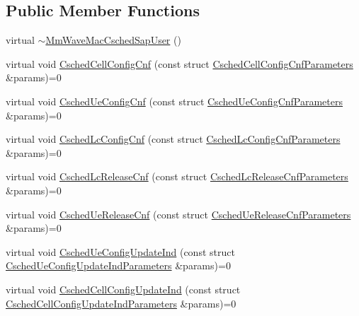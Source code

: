 \subsection*{Public Member Functions}
\begin{DoxyCompactItemize}
\item 
virtual \hyperlink{classns3_1_1MmWaveMacCschedSapUser_a8f051665b658dd765fa5a56bac25d868}{$\sim$\+Mm\+Wave\+Mac\+Csched\+Sap\+User} ()
\item 
virtual void \hyperlink{classns3_1_1MmWaveMacCschedSapUser_ac321b5a86d1d08a4618d9c0c6898f1df}{Csched\+Cell\+Config\+Cnf} (const struct \hyperlink{structns3_1_1MmWaveMacCschedSapUser_1_1CschedCellConfigCnfParameters}{Csched\+Cell\+Config\+Cnf\+Parameters} \&params)=0
\item 
virtual void \hyperlink{classns3_1_1MmWaveMacCschedSapUser_a7c6574b01ef6cfd72a3c027142dff19c}{Csched\+Ue\+Config\+Cnf} (const struct \hyperlink{structns3_1_1MmWaveMacCschedSapUser_1_1CschedUeConfigCnfParameters}{Csched\+Ue\+Config\+Cnf\+Parameters} \&params)=0
\item 
virtual void \hyperlink{classns3_1_1MmWaveMacCschedSapUser_aade532cb1d8a39c0f33c59d0530de20b}{Csched\+Lc\+Config\+Cnf} (const struct \hyperlink{structns3_1_1MmWaveMacCschedSapUser_1_1CschedLcConfigCnfParameters}{Csched\+Lc\+Config\+Cnf\+Parameters} \&params)=0
\item 
virtual void \hyperlink{classns3_1_1MmWaveMacCschedSapUser_a39c995da0285c00af8e3553373fe47b8}{Csched\+Lc\+Release\+Cnf} (const struct \hyperlink{structns3_1_1MmWaveMacCschedSapUser_1_1CschedLcReleaseCnfParameters}{Csched\+Lc\+Release\+Cnf\+Parameters} \&params)=0
\item 
virtual void \hyperlink{classns3_1_1MmWaveMacCschedSapUser_a661fe2e7ba32c3720860977aeb599a2c}{Csched\+Ue\+Release\+Cnf} (const struct \hyperlink{structns3_1_1MmWaveMacCschedSapUser_1_1CschedUeReleaseCnfParameters}{Csched\+Ue\+Release\+Cnf\+Parameters} \&params)=0
\item 
virtual void \hyperlink{classns3_1_1MmWaveMacCschedSapUser_a10f72301f3a7ae3ebe39291ba5360dea}{Csched\+Ue\+Config\+Update\+Ind} (const struct \hyperlink{structns3_1_1MmWaveMacCschedSapUser_1_1CschedUeConfigUpdateIndParameters}{Csched\+Ue\+Config\+Update\+Ind\+Parameters} \&params)=0
\item 
virtual void \hyperlink{classns3_1_1MmWaveMacCschedSapUser_a1625dab030726ad9d8f3c96509246868}{Csched\+Cell\+Config\+Update\+Ind} (const struct \hyperlink{structns3_1_1MmWaveMacCschedSapUser_1_1CschedCellConfigUpdateIndParameters}{Csched\+Cell\+Config\+Update\+Ind\+Parameters} \&params)=0
\end{DoxyCompactItemize}


